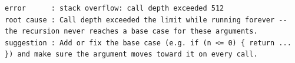 \begin{lstlisting}[]
error      : stack overflow: call depth exceeded 512
root cause : Call depth exceeded the limit while running forever -- the recursion never reaches a base case for these arguments.
suggestion : Add or fix the base case (e.g. if (n <= 0) { return ... }) and make sure the argument moves toward it on every call.
\end{lstlisting}

